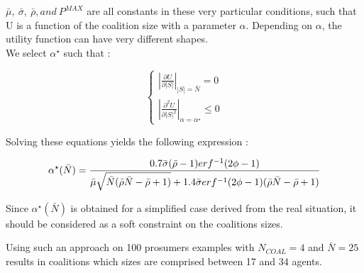\documentclass[journal]{IEEEtran}
\begin{document}
$ \bar{ \mu },\ \bar{ \sigma },\ \bar{ \rho }, and\ P^{MAX} $ are all constants in these very particular conditions, such that U is a function of the coalition size with a parameter $ \alpha $. Depending on $ \alpha $, the utility function can have very different shapes.
\\
We select $\alpha^{\star} $ such that :

\begin{equation}
	\left\{ \begin{array}{lll} \left| \frac{ \partial U }{ \partial |S| } \right|_{|S|=\bar{N}} = 0 \\ \left| \frac{ \partial^2 U }{ \partial |S|^2 } \right|_{\alpha = \alpha^{\star}} \leq 0 \end{array} \right.
\end{equation}

Solving these equations yields the following expression :

\begin{equation}
	\begin{tiny}
		\alpha^{\star} ( \bar{N} ) = \dfrac{0.7 \bar{\sigma}(\bar{\rho}-1)erf^{-1}(2 \phi - 1)}{\bar{\mu}\sqrt{\bar{N}(\bar{\rho}\bar{N}-\bar{\rho}+1)}+1.4 \bar{\sigma} erf^{-1} (2 \phi -1 ) (\bar{\rho}\bar{N}-\bar{\rho} + 1)} 
	\end{tiny}
\end{equation}

Since $ \alpha^{\star} ( \bar{N} ) $ is obtained for a simplified case derived from the real situation, it should be considered as a soft constraint on the coalitions sizes.

Using such an approach on 100 prosumers examples with $N_{COAL} = 4 $ and $\bar{N}=25$ results in coalitions which sizes are comprised between 17 and 34 agents.


  

\end{document}

